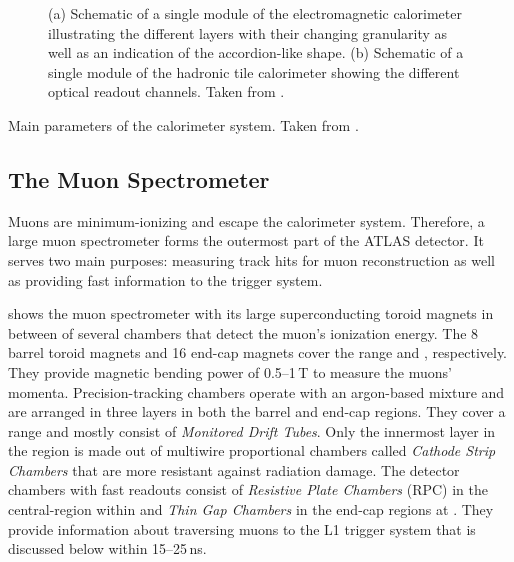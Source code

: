 \begin{figure}
    \caption{(a) Schematic of a single module of the electromagnetic calorimeter illustrating the different layers with their changing granularity as well as an indication of the accordion-like shape. (b) Schematic of a single module of the hadronic tile calorimeter showing the different optical readout channels. Taken from .}
    \label{fig:ATLASmodules}
\end{figure}

\begin{table}
    \caption{Main parameters of the calorimeter system. Taken from .}
    \label{tab:ATLAScalorimeter-parameters}
\end{table}


\subsection{The Muon Spectrometer}
Muons are minimum-ionizing and escape the calorimeter system. Therefore, a large muon spectrometer forms the outermost part of the ATLAS detector. It serves two main purposes: measuring track hits for muon reconstruction as well as providing fast information to the trigger system.

 shows the muon spectrometer with its large superconducting toroid magnets in between of several chambers that detect the muon's ionization energy.
The 8 barrel toroid magnets and 16 end-cap magnets cover the range  and , respectively. They provide magnetic bending power of \numrange{0.5}{1}\,T to measure the muons' momenta. Precision-tracking chambers operate with an argon-based mixture and are arranged in three layers in both the barrel and end-cap regions. They cover a range  and mostly consist of \emph{Monitored Drift Tubes}. Only the innermost layer in the region  is made out of multiwire proportional chambers called \emph{Cathode Strip Chambers} that are more resistant against radiation damage. The detector chambers with fast readouts consist of \emph{Resistive Plate Chambers} (RPC) in the central-region within  and \emph{Thin Gap Chambers} in the end-cap regions at . They provide information about traversing muons to the L1 trigger system that is discussed below within \numrange{15}{25}\,ns.

